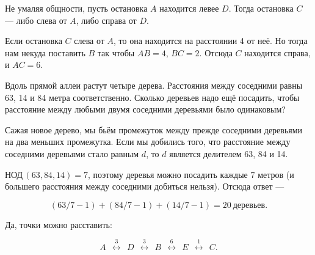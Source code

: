 \begin{itemize}

\itA Не умаляя общности, пусть остановка $A$ находится левее $D$. Тогда остановка $C$ — либо слева от $A$, либо справа от $D$.

Если остановка $C$ слева от $A$, то она находится на расстоянии 4 от неё. Но тогда нам некуда поставить $B$ так чтобы $AB=4$, $BC=2$. Отсюда $C$ находится справа, и $AC=6$.

\itB Вдоль прямой аллеи растут четыре дерева. Расстояния между соседними равны 63, 14 и 84 метра соответственно. Сколько деревьев надо ещё посадить, чтобы расстояние между любыми двумя соседними деревьями было одинаковым?

Сажая новое дерево, мы бьём промежуток между прежде соседними деревьями на два меньших промежутка. Если мы добились того, что расстояние между соседними деревьями стало равным $d$, то $d$ является делителем 63, 84 и 14.

$\text{НОД}\,(63,84,14)=7$, поэтому деревья можно посадить каждые 7 метров (и большего расстояния между соседними добиться нельзя). Отсюда ответ —

$$(63/7-1)+(84/7-1)+(14/7-1) = 20\ \text{деревьев}.$$

\def\disbetw#1{\ \ \stackrel{#1}{\longleftrightarrow}\ \ }

\itC Да, точки можно расставить:

 $$A \disbetw 3 D \disbetw 3 B \disbetw 6 E \disbetw 1 C.$$
\end{itemize}
